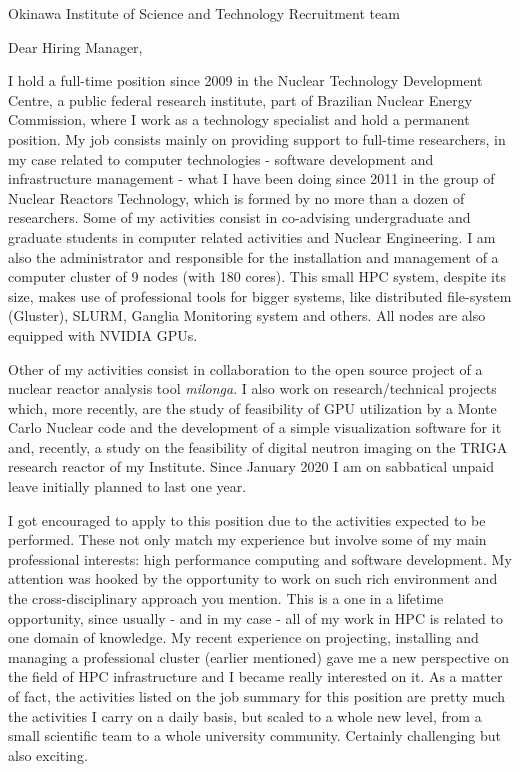 \documentclass[11pt]{letter}
\begin{document}
\begin{letter}{Okinawa Institute of Science and Technology Recruitment team}

  \opening{Dear Hiring Manager,}
  
  I hold a full-time position since 2009 in the Nuclear Technology Development Centre, a public federal
  research institute, part of Brazilian Nuclear Energy Commission, where I work as a technology
  specialist and hold a permanent position. My job consists mainly on
  providing support to full-time researchers, in my case
  related to computer technologies - software development and infrastructure management - what I have been
  doing since 2011 in the group of Nuclear Reactors Technology, which is formed by no more than a dozen of researchers.
  Some of my activities consist in co-advising undergraduate and graduate students in computer related
  activities and Nuclear Engineering. I am also the administrator and responsible for the installation and management of a
  computer cluster of 9 nodes (with 180 cores). This small HPC system, despite its size, makes use of professional tools
  for bigger systems, like distributed file-system (Gluster), SLURM, Ganglia Monitoring system and others. All nodes are
  also equipped with NVIDIA GPUs.
  
  Other of my activities consist in collaboration
  to the open source project of a nuclear reactor
  analysis tool \textit{milonga}. I also work on research/technical projects which, more recently, are the study of
  feasibility of GPU utilization by a Monte Carlo Nuclear code and the development of
  a simple visualization software for it and, recently, a study on the feasibility of digital neutron imaging on
  the TRIGA research reactor of my Institute. Since January 2020 I am on sabbatical unpaid leave initially planned
  to last one year.
    
  I got encouraged to apply to this position due to the activities expected to be performed. These not only
  match my experience but involve some of my main professional interests: high performance computing and
  software development. My attention was hooked by the opportunity to work on such rich environment and the
  cross-disciplinary approach you mention. This is a one in a lifetime opportunity, since usually - and in my
  case - all of my work in HPC is related to one domain of knowledge. %
  My recent experience on projecting, installing and managing a professional
  cluster (earlier mentioned)
  gave me a new perspective on the field of HPC infrastructure and I became really interested on it. As a matter of fact, the activities listed on the job summary for this position are pretty much the activities I carry on a daily basis, but scaled to a whole new level, from a small scientific team to a whole university community. Certainly challenging but also exciting.
  

\end{letter}
\end{document}
